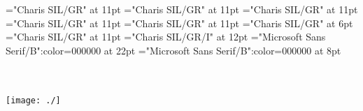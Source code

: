\documentclass[a4paper,twoside]{article}
\begin{document}
\font\picturepictureColumnParagraphscrSectioncolumnsscrBookscrBody="Charis SIL/GR" at 11pt
\font\pictureCaptionpictureColumnParagraphscrSectioncolumnsscrBookscrBody="Charis SIL/GR" at 11pt
\font\spanzxxpictureCaptionpictureColumnParagraphscrSectioncolumnsscrBookscrBody="Charis SIL/GR" at 11pt
\font{}="Charis SIL/GR" at 11pt
\font\ParagraphContinuationscrSectioncolumnsscrBookscrBody="Charis SIL/GR" at 11pt
\font\VerseNumberzxxParagraphContinuationscrSectioncolumnsscrBookscrBody="Charis SIL/GR" at 6pt
\font\spanzxxParagraphContinuationscrSectioncolumnsscrBookscrBody="Charis SIL/GR" at 11pt
\font\AlternateReadingzxxNoteGeneralParagraphParagraphscrSectioncolumnsscrBookscrBody="Charis SIL/GR/I" at 12pt
\color{black} 
\thispagestyle{empty} 
\font\CoverPageTitle="Microsoft Sans Serif/B":color=000000 at 22pt 
\font\pFrontMatterdiv="Microsoft Sans Serif/B":color=000000 at 8pt 
\vskip 60pt 
\begin{center} 
\end{center} 
\newpage 
\newpage 
\thispagestyle{empty} 
\mbox{} 
\begin{titlepage}
\begin{center}
\textsc{\LARGE {}}\\[1.5cm] 
\vspace{110 mm} 
\textsc{ }\\[0.5cm] 
\texttt{[image: ./]}\\[1cm]    
\end{center} 
\end{titlepage} 
\setcounter{page}{3} 
 
\pagestyle{plain} 
\newpage 

\mbox{} 
\newpage 
\newpage 
\setcounter{page}{1} 


\newpage 
\pagestyle{plain} 
\tableofcontents 
\newpage 

\pagestyle{fancy} 
\begin{comment}

\scrBookNamezxxscrBookscrBody{
 \label{PageStock_PreserveNKOu31} Mateo}\end{comment}
 
\end{document}
